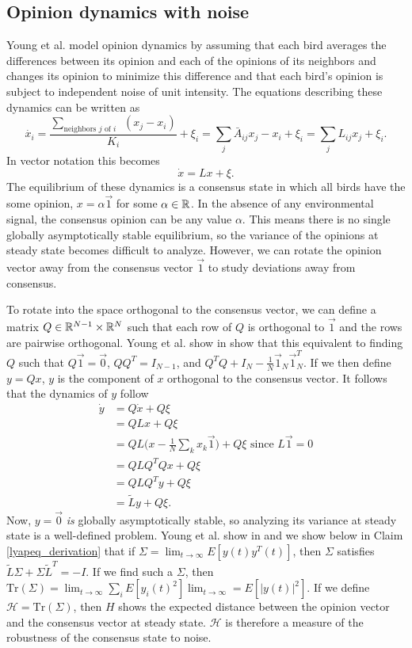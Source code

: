 \documentclass{article}
\newcommand{\Tr}{\text{Tr}}
\begin{document}
\subsection{Opinion dynamics with noise }
Young et al. \cite{Young:2010fk} model opinion dynamics by assuming that each bird averages the differences between its opinion and each of the opinions of its neighbors and changes its opinion to minimize this difference and that each bird's opinion is subject to independent noise of unit intensity. The equations describing these dynamics can be written as 
\begin{equation}
\dot{x_i}=\frac{\sum_{\text{neighbors $j$ of $i$ } }(x_j-x_i)}{K_i} +\xi_i=\sum_j\bar{A}_{ij}x_j-x_i+\xi_i=\sum_jL_{ij}x_j+\xi_i.
\end{equation}
In vector notation this becomes
\begin{equation}
\dot{x}=Lx+\xi.
\end{equation}
The equilibrium of these dynamics is a consensus state in which all birds have the some opinion, $x=\alpha\vec{1}$ for some $\alpha\in{\mathbb{R}}$. In the absence of any environmental signal, the consensus opinion can be any value $\alpha$. This means there is no single globally asymptotically stable equilibrium, so the variance of the opinions at steady state becomes difficult to analyze. However, we can rotate the opinion vector away from the consensus vector $\vec{1}$ to study deviations away from consensus. 

To rotate into the space orthogonal to the consensus vector, we can define a matrix $Q\in{\mathbb{R}}^{N-1}\times{\mathbb{R}}^N$ such that each row of $Q$ is orthogonal to $\vec{1}$ and the rows are pairwise orthogonal. Young et al. show in \cite{Young:2010fk} show that this equivalent to finding $Q$ such that $Q\vec{1}=\vec{0}$, $QQ^T=I_{N-1}$, and $Q^TQ+I_N-\frac{1}{N}\vec{1}_N\vec{1}_N^T$. If we then define $y=Qx$, $y$ is the component of $x$ orthogonal to the consensus vector. It follows that the dynamics of $y$ follow
\begin{align*}
\dot{y}&=Q\dot{x}+Q\xi
\\&=QLx+Q\xi
\\&=QL\big(x-\frac{1}{N}\sum_kx_k\vec{1}\big)+Q\xi \text{ since } L\vec{1}=0
\\&=QLQ^TQx+Q\xi
\\&=QLQ^Ty+Q\xi
\\&=\tilde{L}y+Q\xi.
\end{align*}
Now, $y=\vec{0}$ \emph{is} globally asymptotically stable, so analyzing its variance at steady state is a well-defined problem. Young et al. show in \cite{Young:2010fk} and we show below in Claim \ref{lyapeq_derivation} that if $\Sigma=\lim_{t\to\infty}E[y(t)y^T(t)]$, then $\Sigma$ satisfies $\tilde{L}\Sigma+\Sigma \tilde{L}^T=-I$. If we find such a $\Sigma$, then $\Tr(\Sigma)=\lim_{t\to\infty}\sum_iE[y_i(t)^2]\lim_{t\to\infty}=E[|y(t)|^2].$ If we define $\mathscr{H}=\Tr(\Sigma)$, then $H$ shows the expected distance between the opinion vector and the consensus vector at steady state. $\mathscr{H}$ is therefore a measure of the robustness of the consensus state to noise.
\end{document}
